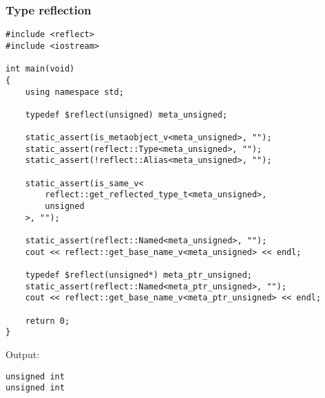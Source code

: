 \subsubsection{Type reflection}

\begin{verbatim}
#include <reflect>
#include <iostream>

int main(void)
{
	using namespace std;

	typedef $reflect(unsigned) meta_unsigned;

	static_assert(is_metaobject_v<meta_unsigned>, "");
	static_assert(reflect::Type<meta_unsigned>, "");
	static_assert(!reflect::Alias<meta_unsigned>, "");

	static_assert(is_same_v<
		reflect::get_reflected_type_t<meta_unsigned>,
		unsigned
	>, "");

	static_assert(reflect::Named<meta_unsigned>, "");
	cout << reflect::get_base_name_v<meta_unsigned> << endl;

	typedef $reflect(unsigned*) meta_ptr_unsigned;
	static_assert(reflect::Named<meta_ptr_unsigned>, "");
	cout << reflect::get_base_name_v<meta_ptr_unsigned> << endl;

	return 0;
}
\end{verbatim}

Output:

\begin{verbatim}
unsigned int
unsigned int
\end{verbatim}

